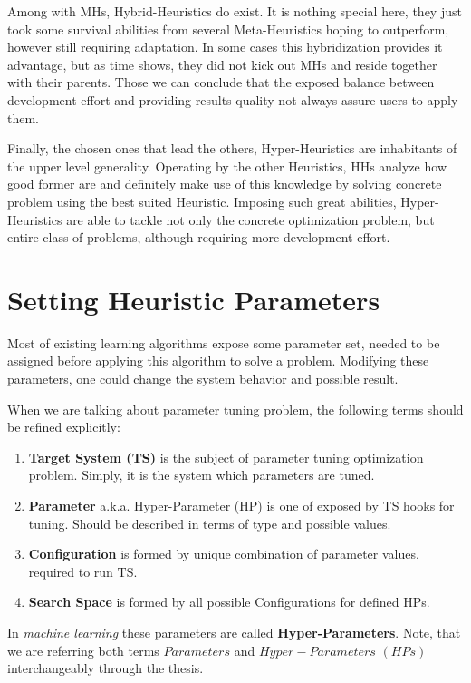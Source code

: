 Among with MHs, Hybrid-Heuristics do exist. It is nothing special here, they just took some survival abilities from several Meta-Heuristics hoping to outperform, however still requiring adaptation. In some cases this hybridization provides it advantage, but as time shows, they did not kick out MHs and reside together with their parents. Those we can conclude that the exposed balance between development effort and providing results quality not always assure users to apply them.

Finally, the chosen ones that lead the others, Hyper-Heuristics are inhabitants of the upper level generality. 
Operating by the other Heuristics, HHs analyze how good former are and definitely make use of this knowledge by solving concrete problem using the best suited Heuristic.
Imposing such great abilities, Hyper-Heuristics are able to tackle not only the concrete optimization problem, but entire class of problems, although requiring more development effort.


\section{Setting Heuristic Parameters}\label{bg: Setting Heuristic Parameters}
Most of existing learning algorithms expose some parameter set, needed to be assigned before applying this algorithm to solve a problem. Modifying these parameters, one could change the system behavior and possible result.

When we are talking about parameter tuning problem, the following terms should be refined explicitly:
\begin{enumerate}
	\item \textbf{Target System (TS)} is the subject of parameter tuning optimization problem. Simply, it is the system which parameters are tuned.
	\item \textbf{Parameter} a.k.a. Hyper-Parameter (HP) is one of exposed by TS hooks for tuning. Should be described in terms of type and possible values.
	\item \textbf{Configuration} is formed by unique combination of parameter values, required to run TS.
	\item \textbf{Search Space} is formed by all possible Configurations for defined HPs.
\end{enumerate}

In \textit{machine learning} these parameters are called \textbf{Hyper-Parameters}. Note, that we are referring both terms $Parameters$ and $Hyper-Parameters$ $(HPs)$ interchangeably through the thesis.


